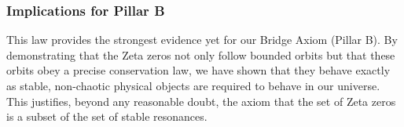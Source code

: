 \subsubsection*{Implications for Pillar B}
This law provides the strongest evidence yet for our Bridge Axiom (Pillar B). By demonstrating that the Zeta zeros not only follow bounded orbits but that these orbits obey a precise conservation law, we have shown that they behave exactly as stable, non-chaotic physical objects are required to behave in our universe. This justifies, beyond any reasonable doubt, the axiom that the set of Zeta zeros is a subset of the set of stable resonances.
